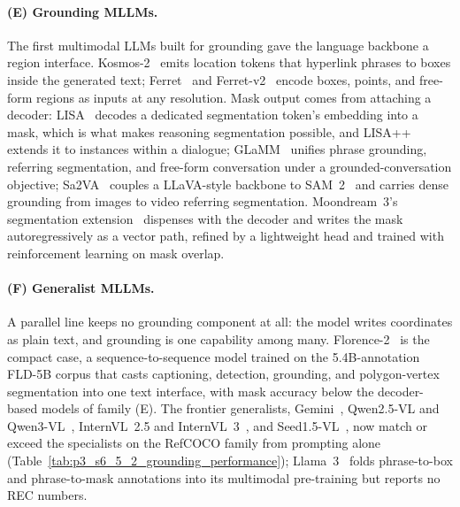 \paragraph{(E) Grounding MLLMs.}
The first multimodal LLMs built for grounding gave the language backbone a region interface. Kosmos-2~\cite{peng2023kosmos} emits location tokens that hyperlink phrases to boxes inside the generated text; Ferret~\cite{you2023ferret} and Ferret-v2~\cite{zhang2024ferret} encode boxes, points, and free-form regions as inputs at any resolution. Mask output comes from attaching a decoder: LISA~\cite{lai2024lisa} decodes a dedicated segmentation token's embedding into a mask, which is what makes reasoning segmentation possible, and LISA++~\cite{yang2023lisa++} extends it to instances within a dialogue; GLaMM~\cite{rasheed2024glamm} unifies phrase grounding, referring segmentation, and free-form conversation under a grounded-conversation objective; Sa2VA~\cite{yuan2025sa2va} couples a LLaVA-style backbone to SAM~2~\cite{ravi2024sam2} and carries dense grounding from images to video referring segmentation. Moondream~3's segmentation extension~\cite{reid2026moondream} dispenses with the decoder and writes the mask autoregressively as a vector path, refined by a lightweight head and trained with reinforcement learning on mask overlap.

\paragraph{(F) Generalist MLLMs.}
A parallel line keeps no grounding component at all: the model writes coordinates as plain text, and grounding is one capability among many. Florence-2~\cite{xiao2024florence} is the compact case, a sequence-to-sequence model trained on the 5.4B-annotation FLD-5B corpus that casts captioning, detection, grounding, and polygon-vertex segmentation into one text interface, with mask accuracy below the decoder-based models of family (E). The frontier generalists, Gemini~\cite{reid2024gemini}, Qwen2.5-VL and Qwen3-VL~\cite{bai2025qwen2.5vl}, InternVL~2.5 and InternVL~3~\cite{chen2024expanding,zhu2025internvl3}, and Seed1.5-VL~\cite{guo2025seed1.5vl}, now match or exceed the specialists on the RefCOCO family from prompting alone (Table~\ref{tab:p3_s6_5_2_grounding_performance}); Llama~3~\cite{grattafiori2024llama} folds phrase-to-box and phrase-to-mask annotations into its multimodal pre-training but reports no REC numbers.

